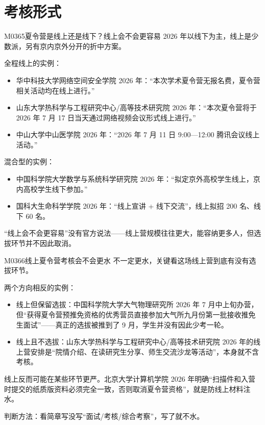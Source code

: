\section{考核形式}
\begin{qa}{M0365}{夏令营是线上还是线下？线上会不会更容易}
2026 年以线下为主，线上是少数派，另有京内京外分开的折中方案。

全程线上的实例：
\begin{itemize}
  \item 华中科技大学网络空间安全学院 2026 年：“本次学术夏令营无报名费，夏令营相关活动均在线上进行。”
  \item 山东大学热科学与工程研究中心/高等技术研究院 2026 年：“本次夏令营将于 2026 年 7 月 17 日当天通过网络视频会议形式线上进行。”
  \item 中山大学中山医学院 2026 年：“2026 年 7 月 11 日 9:00—12:00 腾讯会议线上活动。”
\end{itemize}

混合型的实例：
\begin{itemize}
  \item 中国科学院大学数学与系统科学研究院 2026 年：“拟定京外高校学生线上，京内高校学生线下参加。”
  \item 国科大生命科学学院 2026 年：“线上宣讲 + 线下交流”，线上拟招 200 名、线下 60 名。
\end{itemize}

“线上会不会更容易”没有官方说法——线上营规模往往更大，能容纳更多人，但选拔环节并不因此取消。
\end{qa}

\begin{qa}{M0366}{线上夏令营考核会不会更水}
不一定更水，关键看这场线上营到底有没有选拔环节。

两个方向相反的实例：
\begin{itemize}
  \item 线上但保留选拔：中国科学院大学大气物理研究所 2026 年 7 月中上旬办营，但“获得夏令营预推免资格的优秀营员直接参加大气所九月份第一批接收推免生面试”——真正的选拔被推到了 9 月，学生并没有因此少考一轮。
  \item 线上且不选拔：山东大学热科学与工程研究中心/高等技术研究院 2026 年的线上营安排是“院情介绍、在读研究生分享、师生交流沙龙等活动”，本身就不含考核。
\end{itemize}

线上反而可能在某些环节更严。北京大学计算机学院 2026 年明确“扫描件和入营时提交的纸质版资料必须完全一致，否则取消夏令营资格”，就是防线上材料注水。

判断方法：看简章写没写“面试/考核/综合考察”，写了就不水。
\end{qa}

